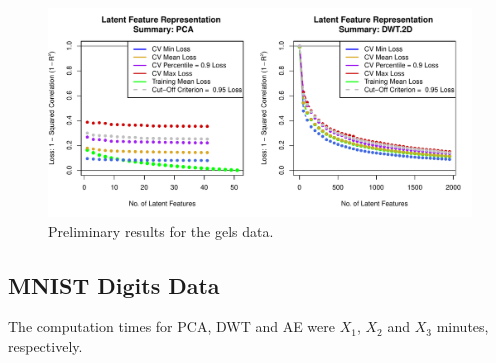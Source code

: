 \begin{figure}
    \centering
    \includegraphics[width=1\linewidth]{figures/initial-gels.pdf}
    \caption{Preliminary results for the gels data.}
    \label{fig:enter-label}
\end{figure}


\subsection{MNIST Digits Data}


The computation times for PCA, DWT and AE were $X_1$, $X_2$ and $X_3$ minutes, respectively.



